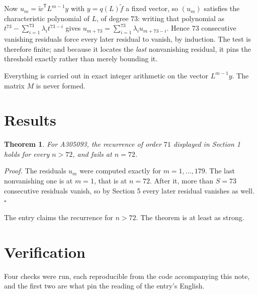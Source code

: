 \documentclass[11pt]{article}
\newtheorem{theorem}{Theorem}
\theoremstyle{definition}
\begin{document}
Now $u_m = \tilde w^{\mathsf T} L^{m-1} y$ with $y = q(L)\tilde f$ a fixed vector, so $(u_m)$ satisfies the characteristic polynomial of $L$, of degree $73$: writing that polynomial as $t^{73} - \sum_{i=1}^{73} \lambda_i t^{73-i}$ gives $u_{m+73} = \sum_{i=1}^{73} \lambda_i u_{m+73-i}$. Hence $73$ consecutive vanishing residuals force every later residual to vanish, by induction. The test is therefore finite; and because it locates the {\itshape last} nonvanishing residual, it pins the threshold exactly rather than merely bounding it.

Everything is carried out in exact integer arithmetic on the vector $L^{m-1}y$. The matrix $M$ is never formed.

\section{Results}

\begin{theorem} For A305093, the recurrence of order $71$ displayed in Section 1 holds for every $n > 72$, and fails at $n = 72$.\end{theorem}

{\itshape Proof.} The residuals $u_m$ were computed exactly for $m = 1,\dots,179$. The last nonvanishing one is at $m = 1$, that is at $n = 72$. After it, more than $S = 73$ consecutive residuals vanish, so by Section 5 every later residual vanishes as well. $\square$

The entry claims the recurrence for $n > 72$. The theorem is at least as strong.

\section{Verification}

Four checks were run, each reproducible from the code accompanying this note, and the first two are what pin the reading of the entry's English.
\end{document}
